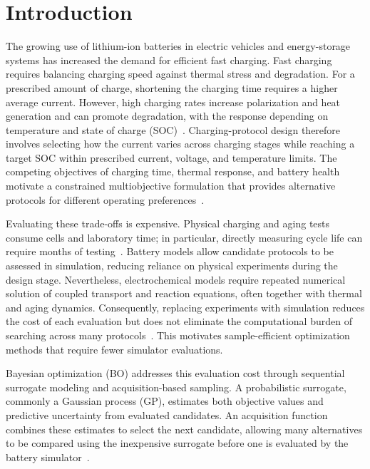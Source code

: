 
\section{Introduction}
\label{sec:introduction}

The growing use of lithium-ion batteries in electric vehicles and energy-storage
systems has increased the demand for efficient fast charging. Fast charging
requires balancing charging speed against thermal stress and degradation. For a
prescribed amount of charge, shortening the charging time requires a higher
average current. However, high charging rates increase polarization and heat
generation and can promote degradation, with the response depending on
temperature and state of charge (SOC)~\cite{refFastChargeReview,refTuXFC}.
Charging-protocol design therefore involves selecting how the current varies
across charging stages while reaching a target SOC within prescribed current,
voltage, and temperature limits. The competing objectives of charging time,
thermal response, and battery health motivate a constrained multiobjective
formulation that provides alternative protocols for different operating
preferences~\cite{nref2,refFanReview,refHuMulti}.

Evaluating these trade-offs is expensive. Physical charging and aging tests
consume cells and laboratory time; in particular, directly measuring cycle
life can require months of testing~\cite{nref3}. Battery models allow candidate
protocols to be assessed in simulation, reducing reliance on physical
experiments during the design stage. Nevertheless, electrochemical models
require repeated numerical solution of coupled transport and reaction
equations, often together with thermal and aging dynamics. Consequently,
replacing experiments with simulation reduces the cost of each evaluation but
does not eliminate the computational burden of searching across many
protocols~\cite{nref7,nref8}. This motivates sample-efficient optimization
methods that require fewer simulator evaluations.

Bayesian optimization (BO) addresses this evaluation cost through sequential
surrogate modeling and acquisition-based sampling. A probabilistic surrogate,
commonly a Gaussian process (GP), estimates both objective values and predictive
uncertainty from evaluated candidates. An acquisition function combines these
estimates to select the next candidate, allowing many alternatives to be
compared using the inexpensive surrogate before one is evaluated by the battery
simulator~\cite{nref6}.

